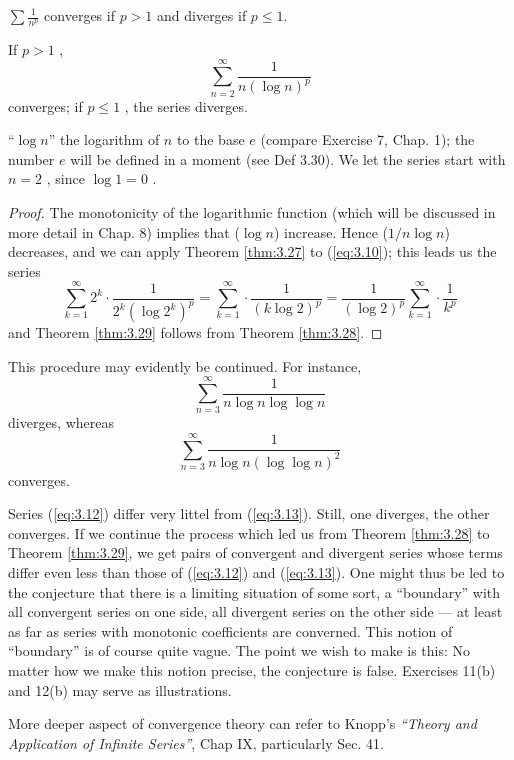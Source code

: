 \begin{thm}
    \label{thm:3.28}
    $\sum \frac{1}{n^p}$ converges if $p>1$ and diverges if $p\leq 1$. 
\end{thm}

\begin{thm}
    \label{thm:3.29}
    If $p > 1$ ,
    \begin{equation}
        \label{eq:3.10}
        \sum_{n=2}^{\infty} \frac{1}{n (\log n)^p}
    \end{equation}
    converges; if $p \leq 1$ , the series diverges.
\end{thm}

``$\log n$'' the logarithm of $n$ to the base $e$ (compare Exercise 7, Chap. 1);
the number $e$ will be defined in a moment (see Def 3.30). We let the series start with $n=2$ , since $\log 1 = 0$ .

\begin{proof}
    The monotonicity of the logarithmic function (which will be discussed in more detail in Chap. 8) implies that ($\log n$) increase. Hence ($1/n \log n$) decreases, and we can apply Theorem \ref{thm:3.27} to (\ref{eq:3.10}); this leads us the series
    \begin{equation}
        \label{eq:3.11}
        \sum_{k=1}^{\infty}2^k\cdot\frac{1}{2^k (\log 2^k)^p} = 
        \sum_{k=1}^{\infty}\cdot\frac{1}{(k\log 2)^p} =
        \frac{1}{(\log 2)^p}\sum_{k=1}^{\infty}\cdot\frac{1}{k^p}
    \end{equation}
    and Theorem \ref{thm:3.29} follows from Theorem \ref{thm:3.28}.
\end{proof}


This procedure may evidently be continued. For instance,
\begin{equation}
    \label{eq:3.12}
    \sum_{n=3}^{\infty}\frac{1}{n \log n \log \log n}
\end{equation}
diverges, whereas
\begin{equation}
    \label{eq:3.13}
    \sum_{n=3}^{\infty}\frac{1}{n \log n (\log \log n)^2}
\end{equation}
converges.

Series (\ref{eq:3.12}) differ very littel from (\ref{eq:3.13}). Still, one diverges, the other converges.
If we continue the process which led us from Theorem \ref{thm:3.28} to Theorem \ref{thm:3.29}, we get pairs of convergent and divergent series whose terms differ even less than those of (\ref{eq:3.12}) and (\ref{eq:3.13}).
One might thus be led to the conjecture that there is a limiting situation of some sort, a ``boundary'' with all convergent series on one side, all divergent series on the other side --- at least as far as series with monotonic coefficients are converned. 
This notion of ``boundary'' is of course quite vague.
The point we wish to make is this: No matter how we make this notion precise, the conjecture is false. Exercises 11(b) and 12(b) may serve as illustrations.

More deeper aspect of convergence theory can refer to Knopp's \emph{``Theory and Application of Infinite Series''}, Chap IX, particularly Sec. 41.
